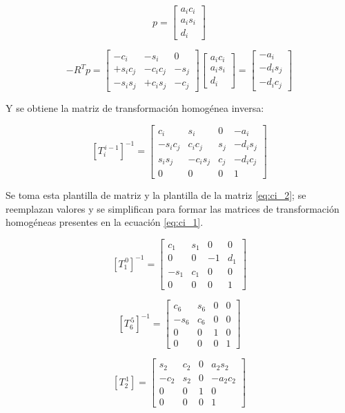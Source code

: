 \documentclass{article}
\begin{document}
\[
p =
\begin{bmatrix}
a_i c_i \\
a_i s_i \\
d_i
\end{bmatrix}
\]

\[
- R^T p =
\begin{bmatrix}
- c_i & - s_i & 0 \\
+ s_i c_j & - c_i c_j & - s_j \\
- s_i s_j & + c_i s_j & - c_j
\end{bmatrix}
\begin{bmatrix}
a_i c_i \\
a_i s_i \\
d_i
\end{bmatrix}
=
\begin{bmatrix}
- a_i \\
- d_i s_j \\
- d_i c_j
\end{bmatrix}
\]

Y se obtiene la matriz de transformación homogénea inversa:

\[
\left[T_i^{\,i-1}\right]^{-1}
=
\begin{bmatrix}
c_i & s_i & 0 & -a_i \\
- s_i c_j & c_i c_j & s_j & -d_i s_j \\
s_i s_j & -c_i s_j & c_j & -d_i c_j \\
0 & 0 & 0 & 1
\end{bmatrix}
\]

Se toma esta plantilla de matriz y la plantilla de la matriz \ref{eq:ci_2}; se reemplazan valores y se simplifican para formar las matrices de transformación homogéneas presentes en la ecuación \ref{eq:ci_1}.

\[
\left[T_1^{\,0}\right]^{-1} =
\begin{bmatrix}
c_1 & s_1 & 0 & 0 \\
0 & 0 & -1 & d_1 \\
- s_1 & c_1 & 0 & 0 \\
0 & 0 & 0 & 1
\end{bmatrix}
\]

\[
\left[T_6^{\,5}\right]^{-1} =
\begin{bmatrix}
c_6 & s_6 & 0 & 0 \\
- s_6 & c_6 & 0 & 0 \\
0 & 0 & 1 & 0 \\
0 & 0 & 0 & 1
\end{bmatrix}
\]

\[
\left[T_2^{\,1}\right] =
\begin{bmatrix}
s_2 & c_2 & 0 & a_2 s_2 \\
- c_2 & s_2 & 0 & -a_2 c_2 \\
0 & 0 & 1 & 0 \\
0 & 0 & 0 & 1
\end{bmatrix}
\]
\end{document}
